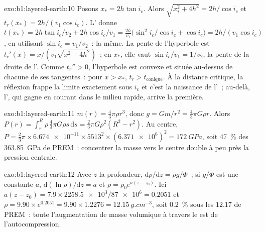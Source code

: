 \begin{solution}{exo:b1:layered-earth:10}
Posons $x_* = 2h\tan i_c$. Alors $\sqrt{x_*^2 + 4h^2} = 2h/\cos i_c$ et
$t_r(x_*) = 2h/(v_1\cos i_c)$. L' donne
$t(x_*) = 2h\tan i_c/v_2 + 2h\cos i_c/v_1 = \frac{2h}{v_1}\bigl(\sin^2 i_c/\cos
i_c + \cos i_c\bigr) = 2h/(v_1\cos i_c)$, en utilisant $\sin i_c = v_1/v_2$~: la
même. La pente de l'hyperbole est $t_r'(x) = x/(v_1\sqrt{x^2 + 4h^2})$~; en $x_*$,
elle vaut $\sin i_c/v_1 = 1/v_2$, la pente de la droite de l'. Comme
$t_r'' > 0$, l'hyperbole est convexe et située au-dessus de chacune de ses
tangentes~: pour $x > x_*$, $t_r > t_{\text{conique}}$. À la distance critique, la
réflexion frappe la limite exactement sous $i_c$ et c'est la naissance de l'~; au-delà, l', qui gagne en courant dans le milieu rapide,
arrive la première.
\end{solution}

\begin{solution}{exo:b1:layered-earth:11}
$m(r) = \tfrac43\pi\rho r^3$, donc $g = Gm/r^2 = \tfrac43\pi G\rho r$. Alors
$P(r) = \int_r^R \rho\,\tfrac43\pi G\rho s\,\mathrm ds = \tfrac23\pi G\rho^2(R^2
- r^2)$. Au centre, $P = \tfrac23\pi\times\num{6.674e-11}\times5513^2\times
(\num{6.371e6})^2 = \qty{172}{GPa}$, soit \qty{47}{\percent} des
\qty{363.85}{GPa} de PREM~: concentrer la masse vers le centre double à peu près
la pression centrale.
\end{solution}

\begin{solution}{exo:b1:layered-earth:12}
Avec $z$ la profondeur, $\mathrm d\rho/\mathrm dz = \rho g/\Phi$~; si $g/\Phi$ est
une constante $a$, $\mathrm d(\ln\rho)/\mathrm dz = a$ et $\rho = \rho_0
e^{a(z - z_0)}$. Ici $a(z - z_0) = 7.9\times\num{2258.5e3}/\num{87e6} =
0.2051$ et $\rho = 9.90\times e^{0.2051} = 9.90\times1.2276 =
\qty{12.15}{g.cm^{-3}}$, soit \qty{0.2}{\percent} sous les $12.17$ de PREM~: toute
l'augmentation de masse volumique à travers le  est de
l'autocompression.
\end{solution}

